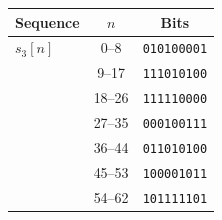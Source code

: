 \begin{tabular}{lcc}
\toprule
Sequence & $n$ & Bits \\
\midrule
$s_3[n]$ & 0--8 & \texttt{010100001} \\
 & 9--17 & \texttt{111010100} \\
 & 18--26 & \texttt{111110000} \\
 & 27--35 & \texttt{000100111} \\
 & 36--44 & \texttt{011010100} \\
 & 45--53 & \texttt{100001011} \\
 & 54--62 & \texttt{101111101} \\
\bottomrule
\end{tabular}
